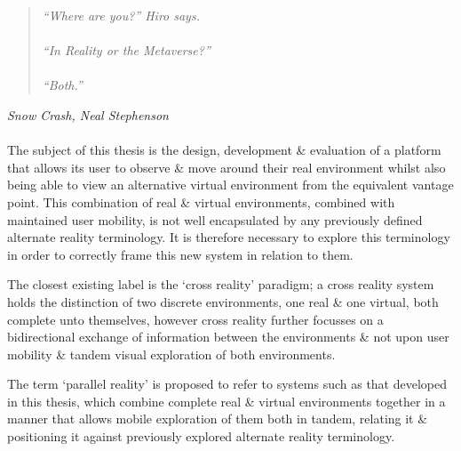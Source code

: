\begin{quote}
\textit{``Where are you?'' Hiro says.
\\
\\
``In Reality or the Metaverse?''
\\
\\
``Both.''}
\end{quote}
\hfill \textit{Snow Crash, Neal Stephenson}
\\
\\




The subject of this thesis is the design, development \& evaluation of a platform that allows its user to observe \& move around their real environment whilst also being able to view an alternative virtual environment from the equivalent vantage point. This combination of real \& virtual environments, combined with maintained user mobility, is not well encapsulated by any previously defined alternate reality terminology. It is therefore necessary to explore this terminology in order to correctly frame this new system in relation to them.

The closest existing label is the `cross reality' paradigm; a cross reality system holds the distinction of two discrete environments, one real \& one virtual, both complete unto themselves, however cross reality further focusses on a bidirectional exchange of information between the environments \& not upon user mobility \& tandem visual exploration of both environments.

The term `parallel reality' is proposed to refer to systems such as that developed in this thesis, which combine complete real \& virtual environments together in a manner that allows mobile exploration of them both in tandem, relating it \& positioning it against previously explored alternate reality terminology.


